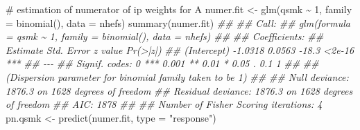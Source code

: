 \documentclass[
  10pt,
  a4paper,
]{book}
\newenvironment{Shaded}{\begin{snugshade}}{\end{snugshade}}
\newcommand{\AttributeTok}[1]{\textcolor[rgb]{0.40,0.45,0.13}{#1}}
\newcommand{\CommentTok}[1]{\textcolor[rgb]{0.37,0.37,0.37}{#1}}
\newcommand{\DecValTok}[1]{\textcolor[rgb]{0.68,0.00,0.00}{#1}}
\newcommand{\DocumentationTok}[1]{\textcolor[rgb]{0.37,0.37,0.37}{\textit{#1}}}
\newcommand{\FunctionTok}[1]{\textcolor[rgb]{0.28,0.35,0.67}{#1}}
\newcommand{\NormalTok}[1]{\textcolor[rgb]{0.00,0.46,0.62}{#1}}
\newcommand{\OtherTok}[1]{\textcolor[rgb]{0.00,0.46,0.62}{#1}}
\newcommand{\SpecialCharTok}[1]{\textcolor[rgb]{0.37,0.37,0.37}{#1}}
\newcommand{\StringTok}[1]{\textcolor[rgb]{0.13,0.47,0.30}{#1}}
\begin{document}
\begin{Shaded}
\begin{Highlighting}[]
\CommentTok{\# estimation of numerator of ip weights for A}
\NormalTok{numer.fit }\OtherTok{\textless{}{-}} \FunctionTok{glm}\NormalTok{(qsmk }\SpecialCharTok{\textasciitilde{}} \DecValTok{1}\NormalTok{, }\AttributeTok{family =} \FunctionTok{binomial}\NormalTok{(), }\AttributeTok{data =}\NormalTok{ nhefs)}
\FunctionTok{summary}\NormalTok{(numer.fit)}
\DocumentationTok{\#\# }
\DocumentationTok{\#\# Call:}
\DocumentationTok{\#\# glm(formula = qsmk \textasciitilde{} 1, family = binomial(), data = nhefs)}
\DocumentationTok{\#\# }
\DocumentationTok{\#\# Coefficients:}
\DocumentationTok{\#\#             Estimate Std. Error z value Pr(\textgreater{}|z|)    }
\DocumentationTok{\#\# (Intercept)  {-}1.0318     0.0563   {-}18.3   \textless{}2e{-}16 ***}
\DocumentationTok{\#\# {-}{-}{-}}
\DocumentationTok{\#\# Signif. codes:  0 \textquotesingle{}***\textquotesingle{} 0.001 \textquotesingle{}**\textquotesingle{} 0.01 \textquotesingle{}*\textquotesingle{} 0.05 \textquotesingle{}.\textquotesingle{} 0.1 \textquotesingle{} \textquotesingle{} 1}
\DocumentationTok{\#\# }
\DocumentationTok{\#\# (Dispersion parameter for binomial family taken to be 1)}
\DocumentationTok{\#\# }
\DocumentationTok{\#\#     Null deviance: 1876.3  on 1628  degrees of freedom}
\DocumentationTok{\#\# Residual deviance: 1876.3  on 1628  degrees of freedom}
\DocumentationTok{\#\# AIC: 1878}
\DocumentationTok{\#\# }
\DocumentationTok{\#\# Number of Fisher Scoring iterations: 4}
\NormalTok{pn.qsmk }\OtherTok{\textless{}{-}} \FunctionTok{predict}\NormalTok{(numer.fit, }\AttributeTok{type =} \StringTok{"response"}\NormalTok{)}


\end{Highlighting}
\end{Shaded}
\end{document}
